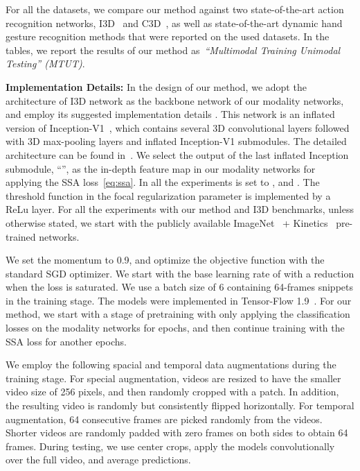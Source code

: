 \documentclass[10pt,twocolumn,letterpaper]{article}
\begin{document}
For all the datasets, we compare our method against two state-of-the-art action recognition networks, I3D~\cite{carreira2017quo} and C3D~\cite{tran2015learning}, as well as state-of-the-art dynamic hand gesture recognition methods that were reported on the used datasets. In the tables, we report the results of our method as~\emph{``Multimodal Training Unimodal Testing'' (MTUT)}.

\noindent \textbf{Implementation Details: } In the design of our method, we adopt the architecture of I3D network as the backbone network of our modality networks, and employ its suggested implementation details \cite{carreira2017quo}.  This network is an inflated version of Inception-V1~\cite{ioffe2015batch}, which contains several 3D convolutional layers followed with 3D max-pooling layers and inflated Inception-V1 submodules. The detailed architecture can be found in~\cite{carreira2017quo}.   We select the output of the last inflated Inception submodule,  ``'', as the in-depth feature map in our modality networks for applying the SSA loss~\eqref{eq:ssa}. In all the experiments  is set to , and  . The threshold function in the focal regularization parameter is implemented by a ReLu layer.   For all the experiments with our method and I3D benchmarks, unless otherwise stated, we start with the publicly available ImageNet~\cite{deng2009imagenet} + Kinetics~\cite{kay2017kinetics} pre-trained networks.




We set the momentum to 0.9, and optimize the objective function with the standard SGD optimizer.   We start with the base learning rate of  with a  reduction when the loss is saturated.  We use a batch size of 6 containing 64-frames snippets in the training stage. The models were implemented in Tensor-Flow 1.9~\cite{abadi2016tensorflow}. For our method, we start with a stage of pretraining with only applying the classification losses on the modality networks for  epochs, and then continue training with the SSA loss for another  epochs.

We employ the following  spacial and temporal data augmentations during the training stage. For special augmentation, videos are resized to have the smaller video size of 256 pixels, and then randomly cropped with a  patch.   In addition, the resulting video is randomly but consistently flipped horizontally.  For temporal augmentation,  64 consecutive frames are picked randomly from the videos.   Shorter videos are randomly padded with zero frames on both sides to obtain 64 frames.  During testing, we use  center crops, apply the models convolutionally over the full video, and average predictions.
\end{document}
